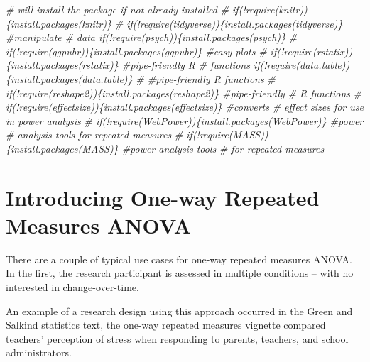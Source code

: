 \documentclass[
  11pt,
]{book}
\newenvironment{Shaded}{\begin{snugshade}}{\end{snugshade}}
\newcommand{\CommentTok}[1]{\textcolor[rgb]{0.56,0.35,0.01}{\textit{#1}}}
\begin{document}
\begin{Shaded}
\begin{Highlighting}[]
\CommentTok{\# will install the package if not already installed}
\CommentTok{\# if(!require(knitr))\{install.packages(\textquotesingle{}knitr\textquotesingle{})\}}
\CommentTok{\# if(!require(tidyverse))\{install.packages(\textquotesingle{}tidyverse\textquotesingle{})\} \#manipulate}
\CommentTok{\# data if(!require(psych))\{install.packages(\textquotesingle{}psych\textquotesingle{})\}}
\CommentTok{\# if(!require(ggpubr))\{install.packages(\textquotesingle{}ggpubr\textquotesingle{})\} \#easy plots}
\CommentTok{\# if(!require(rstatix))\{install.packages(\textquotesingle{}rstatix\textquotesingle{})\} \#pipe{-}friendly R}
\CommentTok{\# functions if(!require(data.table))\{install.packages(\textquotesingle{}data.table\textquotesingle{})\}}
\CommentTok{\# \#pipe{-}friendly R functions}
\CommentTok{\# if(!require(reshape2))\{install.packages(\textquotesingle{}reshape2\textquotesingle{})\} \#pipe{-}friendly}
\CommentTok{\# R functions}
\CommentTok{\# if(!require(effectsize))\{install.packages(\textquotesingle{}effectsize\textquotesingle{})\} \#converts}
\CommentTok{\# effect sizes for use in power analysis}
\CommentTok{\# if(!require(WebPower))\{install.packages(\textquotesingle{}WebPower\textquotesingle{})\} \#power}
\CommentTok{\# analysis tools for repeated measures}
\CommentTok{\# if(!require(MASS))\{install.packages(\textquotesingle{}MASS\textquotesingle{})\} \#power analysis tools}
\CommentTok{\# for repeated measures}
\end{Highlighting}
\end{Shaded}

\hypertarget{introducing-one-way-repeated-measures-anova}{%
\section{Introducing One-way Repeated Measures ANOVA}\label{introducing-one-way-repeated-measures-anova}}

There are a couple of typical use cases for one-way repeated measures ANOVA. In the first, the research participant is assessed in multiple conditions -- with no interested in change-over-time.

An example of a research design using this approach occurred in the Green and Salkind \citeyearpar{green_using_2014} statistics text, the one-way repeated measures vignette compared teachers' perception of stress when responding to parents, teachers, and school administrators.
\end{document}
